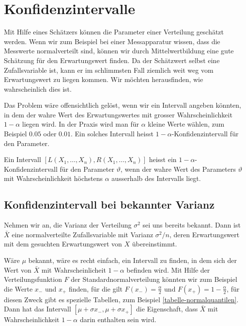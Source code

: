 \section{Konfidenzintervalle} \label{section-konfidenzintervalle}
Mit Hilfe eines Schätzers können die Parameter einer Verteilung
geschätzt werden.
Wenn wir zum Beispiel bei einer Messapparatur
wissen, dass die Messwerte normalverteilt sind, können wir durch
Mittelwertbildung eine gute Schätzung für den Erwartungswert finden.
Da der Schätzwert selbst eine Zufallsvariable ist, kann er
im schlimmsten Fall ziemlich weit weg vom Erwartungswert zu liegen
kommen.
Wir möchten herausfinden, wie wahrscheinlich dies ist.

Das Problem wäre offensichtlich gelöst, wenn wir ein Intervall
angeben könnten, in dem der wahre Wert des Erwartungswertes mit
grosser Wahrscheinlichkeit $1-\alpha$ liegen wird.
In der Praxis
wird man für $\alpha$ kleine Werte wählen, zum Beispiel $0.05$ oder $0.01$.
Ein solches Intervall heisst $1-\alpha$-Konfidenzintervall für den
Parameter.

\begin{definition}
Ein Intervall $[L(X_1,\dots,X_n),R(X_1,\dots,X_n)]$
heisst ein $1-\alpha$-Konfidenzintervall
für den Parameter $\vartheta$, wenn der wahre Wert des Parameters
$\vartheta$ mit Wahrscheinlichkeit höchstens $\alpha$ ausserhalb
des Intervalls liegt.
\end{definition}

\subsection{Konfidenzintervall bei bekannter Varianz}
Nehmen wir an, die Varianz der Verteilung $\sigma^2$ sei uns bereits bekannt.
Dann ist $\bar X$ eine normalverteilte Zufallsvariable mit Varianz
$\sigma^2/n$, deren Erwartungswert mit dem gesuchten Erwartungswert von $X$
übereinstimmt. 

Wäre $\mu$ bekannt, wäre es recht einfach, ein Intervall zu finden,
in dem sich der Wert von $\bar X$ mit Wahrscheinlicheit $1-\alpha$ befinden
wird.
Mit Hilfe der Verteilungsfunktion $F$ der Standardnormalverteilung
könnten wir zum Beispiel die Werte $x_-$ und $x_+$ finden, für die
gilt $F(x_-)=\frac{\alpha}{2}$ und $F(x_+)=1-\frac{\alpha}{2}$, für
diesen Zweck gibt es spezielle Tabellen, zum Beispiel
\ref{tabelle-normalquantilen}.
Dann hat das Intervall
$[\mu+\sigma x_-,\mu+\sigma x_+]$ die Eigenschaft, dass $\bar X$
mit Wahrscheinlichkeit $1-\alpha$ darin enthalten sein wird.

